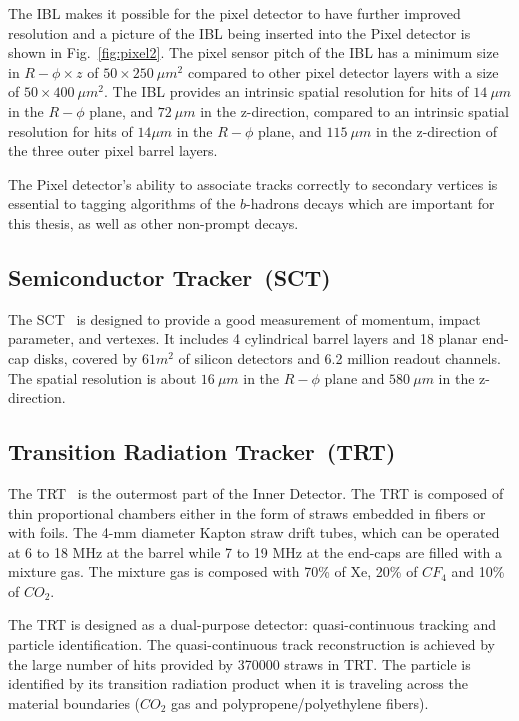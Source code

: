 \par The IBL makes it possible for the pixel detector to have further improved resolution and a picture of the IBL being inserted into the Pixel detector is shown in Fig.~\ref{fig:pixel2}. The pixel sensor pitch of the IBL has a minimum size in $R-\phi \times z$ of $50 \times 250~\mu m^2$ compared to other pixel detector layers with a size of $50 \times 400~\mu m^2$. The IBL provides an intrinsic spatial resolution for hits of $14~\mu m$ in the $R-\phi$ plane, and $72~\mu m$ in the z-direction, compared to an intrinsic spatial resolution for hits of $14\mu m$ in the $R-\phi$ plane, and $115~\mu m$ in the z-direction of the three outer pixel barrel layers.

\par The Pixel detector's ability to associate tracks correctly to secondary vertices is essential to tagging algorithms of the $b$-hadrons decays which are important for this thesis, as well as other non-prompt decays.

\subsection{Semiconductor Tracker~(SCT)}
\par The SCT~\cite{AHMAD200798} is designed to provide a good measurement of momentum, impact parameter, and vertexes. It includes 4 cylindrical barrel layers and 18 planar end-cap disks, covered by $61 m^2$ of silicon detectors and 6.2 million readout channels. The spatial resolution is about $16~\mu m$ in the $R-\phi$ plane and $580~\mu m$ in the z-direction.

\subsection{Transition Radiation Tracker~(TRT)}
\par The TRT~\cite{Abat:2008zza} is the outermost part of the Inner Detector. The TRT is composed of thin proportional chambers either in the form of straws embedded in fibers or with foils. The 4-mm diameter Kapton straw drift tubes, which can be operated at 6 to 18 MHz at the barrel while 7 to 19 MHz at the end-caps are filled with a mixture gas. The mixture gas is composed with 70\% of Xe, 20\% of $CF_{4}$ and 10\% of $CO_{2}$.

\par The TRT is designed as a dual-purpose detector: quasi-continuous tracking and particle identification. The quasi-continuous track reconstruction is achieved by the large number of hits provided by 370000 straws in TRT. The particle is identified by its transition radiation product when it is traveling across the material boundaries ($CO_{2}$ gas and polypropene/polyethylene fibers). 

